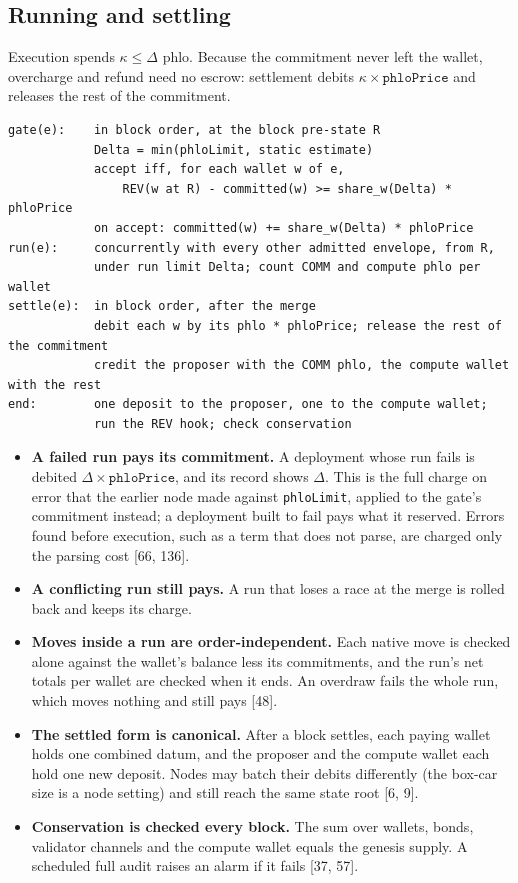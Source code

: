 \documentclass[10.5pt]{article}
\newcommand{\code}[1]{\texttt{#1}}
\newcommand{\D}[1]{{\color{muted}\small[#1]}}
\begin{document}
\subsection{Running and settling}

Execution spends $\kappa \le \Delta$ phlo. Because the commitment never left the wallet, overcharge and refund need no escrow: settlement debits $\kappa \times \code{phloPrice}$ and releases the rest of the commitment.

\begin{Verbatim}[fontsize=\footnotesize,frame=leftline,framesep=8pt,rulecolor=\color{brandsky},xleftmargin=6pt]
gate(e):    in block order, at the block pre-state R
            Delta = min(phloLimit, static estimate)
            accept iff, for each wallet w of e,
                REV(w at R) - committed(w) >= share_w(Delta) * phloPrice
            on accept: committed(w) += share_w(Delta) * phloPrice
run(e):     concurrently with every other admitted envelope, from R,
            under run limit Delta; count COMM and compute phlo per wallet
settle(e):  in block order, after the merge
            debit each w by its phlo * phloPrice; release the rest of the commitment
            credit the proposer with the COMM phlo, the compute wallet with the rest
end:        one deposit to the proposer, one to the compute wallet;
            run the REV hook; check conservation
\end{Verbatim}

\begin{itemize}
\item \textbf{A failed run pays its commitment.} A deployment whose run fails is debited $\Delta \times \code{phloPrice}$, and its record shows $\Delta$. This is the full charge on error that the earlier node made against \code{phloLimit}, applied to the gate's commitment instead; a deployment built to fail pays what it reserved. Errors found before execution, such as a term that does not parse, are charged only the parsing cost \D{66, 136}.
\item \textbf{A conflicting run still pays.} A run that loses a race at the merge is rolled back and keeps its charge.
\item \textbf{Moves inside a run are order-independent.} Each native move is checked alone against the wallet's balance less its commitments, and the run's net totals per wallet are checked when it ends. An overdraw fails the whole run, which moves nothing and still pays \D{48}.
\item \textbf{The settled form is canonical.} After a block settles, each paying wallet holds one combined datum, and the proposer and the compute wallet each hold one new deposit. Nodes may batch their debits differently (the box-car size is a node setting) and still reach the same state root \D{6, 9}.
\item \textbf{Conservation is checked every block.} The sum over wallets, bonds, validator channels and the compute wallet equals the genesis supply. A scheduled full audit raises an alarm if it fails \D{37, 57}.
\end{itemize}
\end{document}
